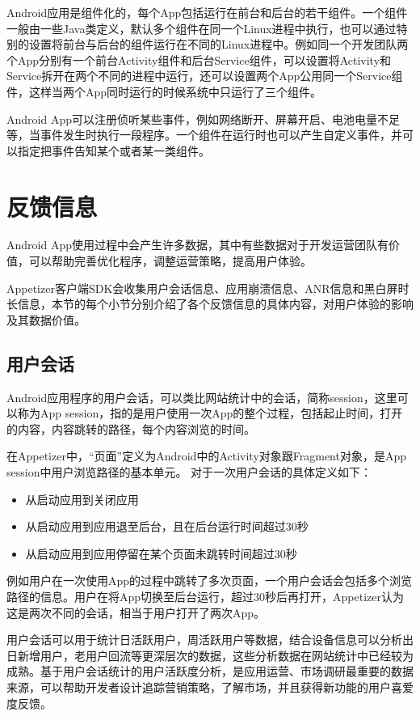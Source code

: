 Android应用是组件化的，每个App包括运行在前台和后台的若干组件。一个组件一般由一些Java类定义，默认多个组件在同一个Linux进程中执行，也可以通过特别的设置将前台与后台的组件运行在不同的Linux进程中。例如同一个开发团队两个App分别有一个前台Activity组件和后台Service组件，可以设置将Activity和Service拆开在两个不同的进程中运行，还可以设置两个App公用同一个Service组件，这样当两个App同时运行的时候系统中只运行了三个组件。

Android App可以注册侦听某些事件，例如网络断开、屏幕开启、电池电量不足等，当事件发生时执行一段程序。一个组件在运行时也可以产生自定义事件，并可以指定把事件告知某个或者某一类组件。

\section{反馈信息}
\label{sec:replyInfo}

Android App使用过程中会产生许多数据，其中有些数据对于开发运营团队有价值，可以帮助完善优化程序，调整运营策略，提高用户体验。

Appetizer客户端SDK会收集用户会话信息、应用崩溃信息、ANR信息和黑白屏时长信息，本节的每个小节分别介绍了各个反馈信息的具体内容，对用户体验的影响及其数据价值。

\subsection{用户会话}

Android应用程序的用户会话，可以类比网站统计中的会话，简称session，这里可以称为App session，指的是用户使用一次App的整个过程，包括起止时间，打开的内容，内容跳转的路径，每个内容浏览的时间。

在Appetizer中，“页面”定义为Android中的Activity对象跟Fragment对象，是App session中用户浏览路径的基本单元。
对于一次用户会话的具体定义如下：

\begin{itemize}
	\item 从启动应用到关闭应用
	\item 从启动应用到应用退至后台，且在后台运行时间超过30秒
	\item 从启动应用到应用停留在某个页面未跳转时间超过30秒
\end{itemize}

例如用户在一次使用App的过程中跳转了多次页面，一个用户会话会包括多个浏览路径的信息。用户在将App切换至后台运行，超过30秒后再打开，Appetizer认为这是两次不同的会话，相当于用户打开了两次App。

用户会话可以用于统计日活跃用户，周活跃用户等数据，结合设备信息可以分析出日新增用户，老用户回流等更深层次的数据，这些分析数据在网站统计中已经较为成熟。基于用户会话统计的用户活跃度分析，是应用运营、市场调研最重要的数据来源，可以帮助开发者设计追踪营销策略，了解市场，并且获得新功能的用户喜爱度反馈。

